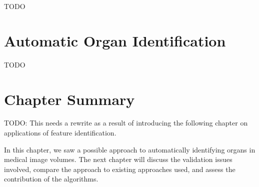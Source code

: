 TODO

\section{Automatic Organ Identification}

TODO

\section{Chapter Summary}

TODO: This needs a rewrite as a result of introducing the following chapter on applications of feature identification.

In this chapter, we saw a possible approach to automatically identifying organs in medical image volumes. The next chapter will discuss the validation issues involved, compare the approach to existing approaches used, and assess the contribution of the algorithms.
